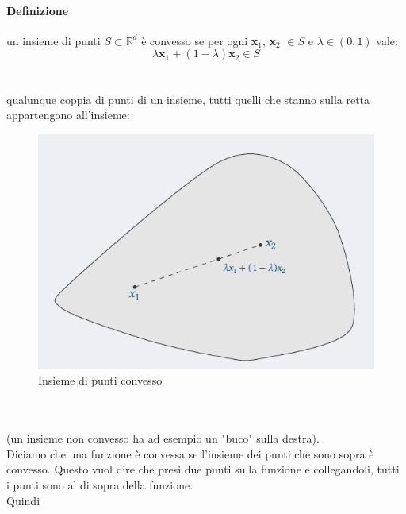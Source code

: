 \documentclass[12pt, oneside]{extbook}
\begin{document}
\paragraph{Definizione} un insieme di punti $S \subset \mathbb{R}^d$ è convesso se per ogni \textbf{x}$_1$, \textbf{x}$_2$ $\in S$ e $\lambda \in (0,1)$ vale:
\begin{equation}
	\lambda\textbf{x}_1 + (1- \lambda)\textbf{x}_2 \in S
\end{equation}
\\\\
qualunque coppia di punti di un insieme, tutti quelli che stanno sulla retta appartengono all'insieme:\\
\begin{figure}[!h]
	\includegraphics[scale=0.5]{immagini/insieme_convex.png}
	\caption{Insieme di punti convesso}
\end{figure}\\\\
(un insieme non convesso ha ad esempio un "buco" sulla destra).\\Diciamo che una funzione è convessa se l'insieme dei punti che sono sopra è convesso. Questo vuol dire che presi due punti sulla funzione e collegandoli, tutti i punti sono al di sopra della funzione.\\Quindi
\end{document}
